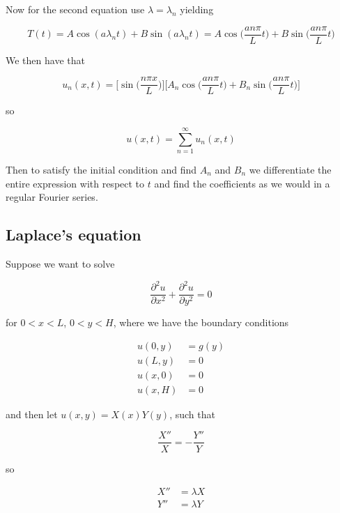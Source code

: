 \documentclass[a4paper]{article}
\begin{document}
Now for the second equation use $\lambda=\lambda_n$ yielding

\begin{equation*}
    T(t)=A\cos(a\lambda_n t)+B\sin(a\lambda_n t)=A\cos\bigg(\frac{an\pi}{L}t\bigg)+B\sin\bigg(\frac{an\pi}{L} t\bigg)
\end{equation*}

We then have that

\begin{equation*}
    u_n(x, t)=\bigg[\sin\bigg(\frac{n\pi x}{L}\bigg)\bigg]\bigg[A_n\cos\bigg(\frac{an\pi}{L}t\bigg)+B_n\sin\bigg(\frac{an\pi}{L} t\bigg)\bigg]
\end{equation*}

so

\begin{equation*}
    u(x, t)=\sum_{n=1}^{\infty} u_n(x, t)
\end{equation*}

Then to satisfy the initial condition and find $A_n$ and $B_n$ we differentiate the entire expression with respect to $t$ and find the coefficients as we would in a regular Fourier series.

\subsection{Laplace's equation}

Suppose we want to solve

\begin{equation*}
    \frac{\partial^2 u}{\partial x^2}+\frac{\partial^2 u}{\partial y^2}=0
\end{equation*}

for $0<x<L$, $0<y<H$, where we have the boundary conditions

\begin{align*}
    u(0, y)&=g(y)\\[1em]
    u(L, y)&=0\\[1em]
    u(x, 0)&=0\\[1em]
    u(x, H)&=0
\end{align*}

and then let $u(x, y)=X(x)Y(y)$, such that

\begin{equation*}
    \frac{X''}{X}=-\frac{Y''}{Y}
\end{equation*}

so

\begin{align*}
    X''&=\lambda X\\[1em]
    Y''&=\lambda Y
\end{align*}
\end{document}
